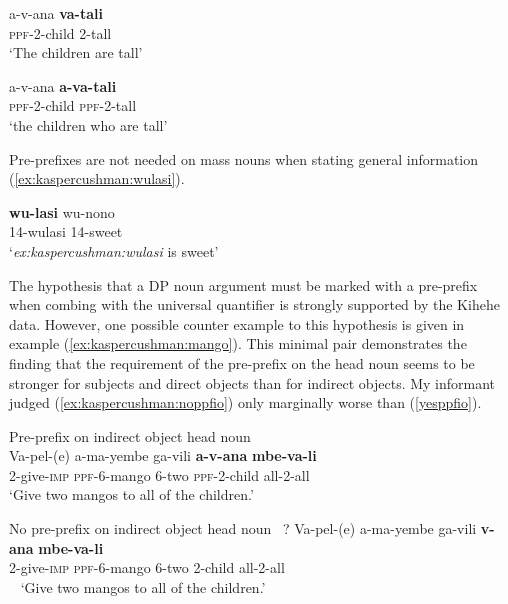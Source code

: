 \documentclass[letterpaper, 12pt]{article}
\begin{document}
\begin{exe}
\singlespacing
\ex \label{ex:kaspercushman:tall} \begin{xlist}

\ex \gll a-v-ana \textbf{va-tali} \\
\textsc{ppf}-2-child 2-tall  \\
`The children are tall'


\ex \gll a-v-ana \textbf{a-va-tali} \\
\textsc{ppf}-2-child \textsc{ppf}-2-tall \\
`the children who are tall'

\end{xlist}
\end{exe}

Pre-prefixes are not needed on mass nouns when stating general information (\ref{ex:kaspercushman:wulasi}). 


\begin{exe}

\ex \label{ex:kaspercushman:wulasi} \gll \textbf{wu-lasi} wu-nono \\
14-wulasi 14-sweet \\
`\textit{ex:kaspercushman:wulasi} is sweet'

\end{exe}

The hypothesis that a DP noun argument must be marked with a pre-prefix when combing with the universal quantifier is strongly supported by the Kihehe data.  However, one possible counter example to this hypothesis is given in example (\ref{ex:kaspercushman:mango}). This minimal pair demonstrates the finding that the requirement of the pre-prefix on the head noun seems to be stronger for subjects and direct objects than for indirect objects.  My informant judged (\ref{ex:kaspercushman:noppfio}) only marginally worse than (\ref{yesppfio}). 

\begin{exe} 
\singlespacing
\ex  \label{ex:kaspercushman:mango} \begin{xlist}

\ex Pre-prefix on indirect object head noun \\
\gll Va-pel-(e) a-ma-yembe ga-vili \textbf{a-v-ana} \textbf{mbe-va-li} \\
2-give-\textsc{imp} \textsc{ppf}-6-mango 6-two \textsc{ppf}-2-child all-2-all\\ 
\vspace{-1.25ex}
`Give two mangos to all of the children.' \\ \label{yesppfio} 

\vspace{5mm}

\ex No pre-prefix on indirect object head noun \
\gll ? Va-pel-(e) a-ma-yembe ga-vili \textbf{v-ana} \textbf{mbe-va-li} \\
{} 2-give-\textsc{imp} \textsc{ppf}-6-mango 6-two 2-child all-2-all\\ \label{ex:kaspercushman:noppfio}\
\vspace{-1.25ex}
`Give two mangos to all of the children.'

\end{xlist}
\end{exe}
\end{document}
